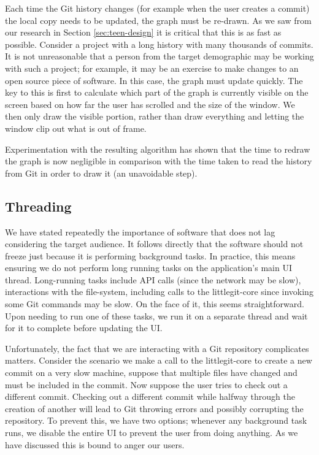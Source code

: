 
Each time the Git history changes (for example when the user creates a commit) the local copy needs to be updated, the graph must be re-drawn. As we saw from our research in Section \ref{sec:teen-design} it is critical that this is as fast as possible. Consider a project with a long history with many thousands of commits. It is not unreasonable that a person from the target demographic may be working with such a project; for example, it may be an exercise to make changes to an open source piece of software. In this case, the graph must update quickly. The key to this is first to calculate which part of the graph is currently visible on the screen based on how far the user has scrolled and the size of the window. We then only draw the visible portion, rather than draw everything and letting the window clip out what is out of frame.

Experimentation with the resulting algorithm has shown that the time to redraw the graph is now negligible in comparison with the time taken to read the history from Git in order to draw it (an unavoidable step).

\subsection{Threading}

We have stated repeatedly the importance of software that does not lag considering the target audience. It follows directly that the software should not freeze just because it is performing background tasks. In practice, this means ensuring we do not perform long running tasks on the application's main UI thread. Long-running tasks include API calls (since the network may be slow), interactions with the file-system, including calls to the littlegit-core since invoking some Git commands may be slow. On the face of it, this seems straightforward. Upon needing to run one of these tasks, we run it on a separate thread and wait for it to complete before updating the UI.

Unfortunately, the fact that we are interacting with a Git repository complicates matters. Consider the scenario we make a call to the littlegit-core to create a new commit on a very slow machine, suppose that multiple files have changed and must be included in the commit. Now suppose the user tries to check out a different commit. Checking out a different commit while halfway through the creation of another will lead to Git throwing errors and possibly corrupting the repository. To prevent this, we have two options; whenever any background task runs, we disable the entire UI to prevent the user from doing anything. As we have discussed this is bound to anger our users.

